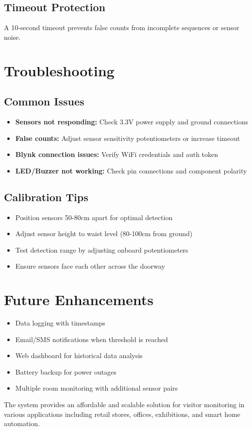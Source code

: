 \documentclass[12pt,a4paper]{article}
\begin{document}
\subsection{Timeout Protection}
A 10-second timeout prevents false counts from incomplete sequences or sensor noise.

\section{Troubleshooting}

\subsection{Common Issues}
\begin{itemize}
  \item \textbf{Sensors not responding:} Check 3.3V power supply and ground connections
  \item \textbf{False counts:} Adjust sensor sensitivity potentiometers or increase timeout
  \item \textbf{Blynk connection issues:} Verify WiFi credentials and auth token
  \item \textbf{LED/Buzzer not working:} Check pin connections and component polarity
\end{itemize}

\subsection{Calibration Tips}
\begin{itemize}
  \item Position sensors 50-80cm apart for optimal detection
  \item Adjust sensor height to waist level (80-100cm from ground)
  \item Test detection range by adjusting onboard potentiometers
  \item Ensure sensors face each other across the doorway
\end{itemize}

\section{Future Enhancements}

\begin{itemize}
  \item Data logging with timestamps
  \item Email/SMS notifications when threshold is reached
  \item Web dashboard for historical data analysis
  \item Battery backup for power outages
  \item Multiple room monitoring with additional sensor pairs
\end{itemize}


The system provides an affordable and scalable solution for visitor monitoring in various applications including retail stores, offices, exhibitions, and smart home automation.
\end{document}
